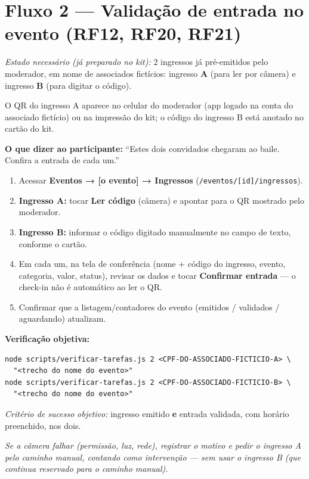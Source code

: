 \documentclass[11pt,a4paper]{article}
\newcommand{\dizer}[1]{%
  \noindent\colorbox{lightbg}{%
    \begin{minipage}{0.95\linewidth}
    \vspace{1mm}
    \textbf{O que dizer ao participante:} ``#1''
    \vspace{1mm}
    \end{minipage}%
  }\vspace{3mm}
}
\newcommand{\criterio}[1]{%
  \noindent\textit{Critério de sucesso objetivo:} #1
}
\newcommand{\estado}[1]{%
  \noindent\textit{Estado necessário (já preparado no kit):} #1
  \vspace{2mm}
}
\begin{document}
\section*{Fluxo 2 --- Validação de entrada no evento (RF12, RF20, RF21)}

\estado{2 ingressos já pré-emitidos pelo moderador, em nome de associados fictícios: ingresso
\textbf{A} (para ler por câmera) e ingresso \textbf{B} (para digitar o código).}

O QR do ingresso A aparece no celular do moderador (app logado na conta do associado fictício) ou
na impressão do kit; o código do ingresso B está anotado no cartão do kit.

\dizer{Estes dois convidados chegaram ao baile. Confira a entrada de cada um.}

\begin{enumerate}[leftmargin=6mm]
  \item Acessar \textbf{Eventos → [o evento] → Ingressos} (\texttt{/eventos/[id]/ingressos}).
  \item \textbf{Ingresso A:} tocar \textbf{Ler código} (câmera) e apontar para o QR mostrado pelo
    moderador.
  \item \textbf{Ingresso B:} informar o código digitado manualmente no campo de texto, conforme o
    cartão.
  \item Em cada um, na tela de conferência (nome + código do ingresso, evento, categoria, valor,
    status), revisar os dados e tocar \textbf{Confirmar entrada} --- o check-in não é automático
    ao ler o QR.
  \item Confirmar que a listagem/contadores do evento (emitidos / validados / aguardando)
    atualizam.
\end{enumerate}

\textbf{Verificação objetiva:}
\begin{small}
\begin{verbatim}
node scripts/verificar-tarefas.js 2 <CPF-DO-ASSOCIADO-FICTICIO-A> \
  "<trecho do nome do evento>"
node scripts/verificar-tarefas.js 2 <CPF-DO-ASSOCIADO-FICTICIO-B> \
  "<trecho do nome do evento>"
\end{verbatim}
\end{small}
\criterio{ingresso emitido \textbf{e} entrada validada, com horário preenchido, nos dois.}

\vspace{1mm}
\noindent\textit{Se a câmera falhar (permissão, luz, rede), registrar o motivo e pedir o ingresso
A pelo caminho manual, contando como intervenção --- sem usar o ingresso B (que continua reservado
para o caminho manual).}
\end{document}
